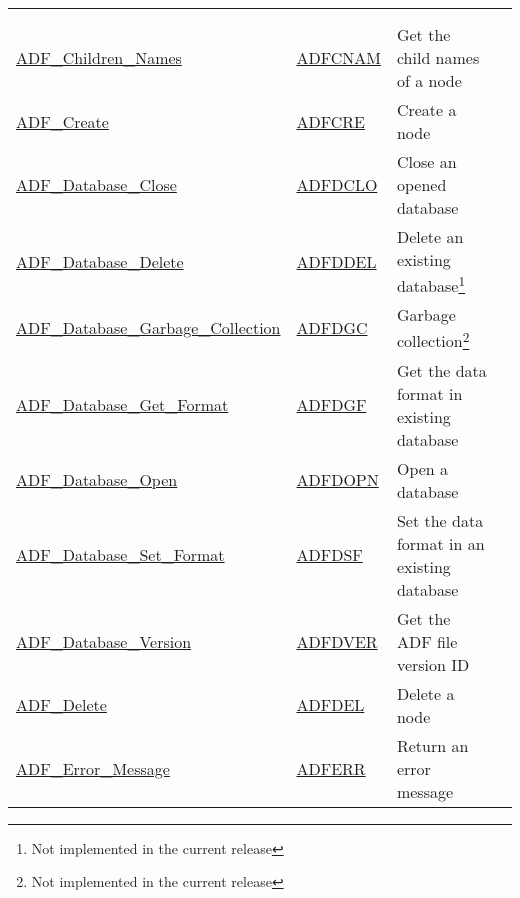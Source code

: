 \begin{longtable}{>{\ttfamily}l >{\ttfamily}l >{\raggedright\arraybackslash}p{\Pwidth} c}
\\*[-2ex]\hline
\multicolumn{4}{r}{\emph{Continued on next page}} \\
\endfoot
\\*[-2ex] \hline\hline
\endlastfoot
\hyperlink{sub:Children\_Names}{ADF\_Children\_Names} &
   \hyperlink{sub:Children\_Names}{ADFCNAM} &
   Get the child names of a node &
   \pageref*{sub:Children_Names} \\
\hyperlink{sub:Create}{ADF\_Create} &
   \hyperlink{sub:Create}{ADFCRE} &
   Create a node &
   \pageref*{sub:Create} \\
\hyperlink{sub:Database\_Close}{ADF\_Database\_Close}	 &
   \hyperlink{sub:Database\_Close}{ADFDCLO} &
   Close an opened database &
   \pageref*{sub:Database_Close} \\
\hyperlink{sub:Database\_Delete}{ADF\_Database\_Delete} &
   \hyperlink{sub:Database\_Delete}{ADFDDEL} &
   Delete an existing database\footnote{
      Not implemented in the current release} &
   \pageref*{sub:Database_Delete} \\
\hyperlink{sub:Database\_Garbage\_Collection}{ADF\_Database\_Garbage\_Collection} &
   \hyperlink{sub:Database\_Garbage\_Collection}{ADFDGC} &
   Garbage collection\footnote{Not implemented in the current release} &
   \pageref*{sub:Database_Garbage_Collection} \\
\hyperlink{sub:Database\_Get\_Format}{ADF\_Database\_Get\_Format} &
   \hyperlink{sub:Database\_Get\_Format}{ADFDGF} &
   Get the data format in existing database &
   \pageref*{sub:Database_Get_Format} \\
\hyperlink{sub:Database\_Open}{ADF\_Database\_Open} &
   \hyperlink{sub:Database\_Open}{ADFDOPN} &
   Open a database &
   \pageref*{sub:Database_Open} \\
\hyperlink{sub:Database\_Set\_Format}{ADF\_Database\_Set\_Format} &
   \hyperlink{sub:Database\_Set\_Format}{ADFDSF} &
   Set the data format in an existing database &
   \pageref*{sub:Database_Set_Format} \\
\hyperlink{sub:Database\_Version}{ADF\_Database\_Version} &
   \hyperlink{sub:Database\_Version}{ADFDVER} &
   Get the ADF file version ID &
   \pageref*{sub:Database_Version} \\
\hyperlink{sub:Delete}{ADF\_Delete} &
   \hyperlink{sub:Delete}{ADFDEL} &
   Delete a node &
   \pageref*{sub:Delete} \\
\hyperlink{sub:Error\_Message}{ADF\_Error\_Message} &
   \hyperlink{sub:Error\_Message}{ADFERR} &
   Return an error message &
   \pageref*{sub:Error_Message} \\

\end{longtable}
